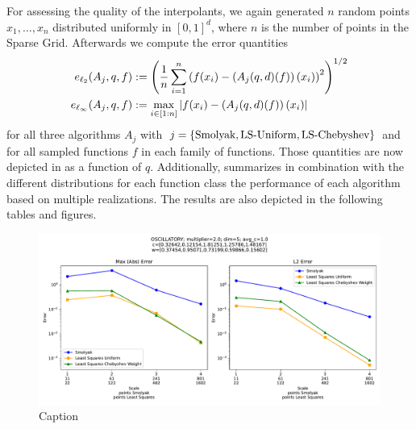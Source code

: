 \documentclass[12pt, oneside]{amsart}
\theoremstyle{definition}
\theoremstyle{remark}
\numberwithin{equation}{section}
\begin{document}
For assessing the quality of the interpolants, we again generated $n$ random points 
$x_1, \ldots, x_n$ distributed uniformly in $[0,1]^d$, where $n$ is the number 
of points in the Sparse Grid. Afterwards we compute the error quantities
\begin{align*} 
	e_{\ell_2}(A_j,q,f) &:= \left(\frac{1}{n}\sum_{i=1}^{n}
	\left(f(x_i)-\left(A_j(q,d)(f)\right)(x_i)\right)^2\right)^{1/2}\\
	e_{\ell_\infty}(A_j,q,f) &:= \max_{i\in[1:n]} 
	\left \vert f(x_i)-\left(A_j(q,d)(f)\right)(x_i) \right \vert
\end{align*}
for all three algorithms $A_j$ with $j=\left\{\text{Smolyak}, \text{LS-Uniform}, 
\text{LS-Chebyshev}\right\}$ and for all sampled functions $f$ in each family of 
functions. Those quantities are now depicted in 
 as a function of $q$. 
Additionally,  summarizes in combination with 
the different distributions for each function class 
 the performance of each algorithm based on multiple realizations. 
The results are also depicted in the following tables and figures.




\newpage



\begin{figure}[H]
	\centering
	\includegraphics[width=\linewidth]{figures/oscillatory/realization1_dim5_scale4.pdf}
	\caption{Caption}
	\label{fig:Osc_1_dim5_scale4}
\end{figure}
\end{document}

